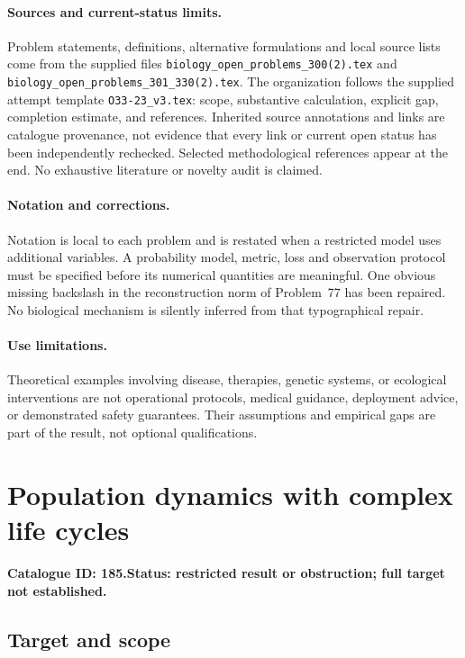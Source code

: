 \documentclass[11pt]{article}
\begin{document}
\paragraph{Sources and current-status limits.}
Problem statements, definitions, alternative formulations and local source lists
come from the supplied files
\texttt{biology\_open\_problems\_300(2).tex} and
\texttt{biology\_open\_problems\_301\_330(2).tex}.
The organization follows the supplied attempt template
\texttt{O33-23\_v3.tex}: scope, substantive calculation, explicit gap,
completion estimate, and references. Inherited source annotations and links are
catalogue provenance, not evidence that every link or current open status has
been independently rechecked. Selected methodological references appear at the
end. No exhaustive literature or novelty audit is claimed.

\paragraph{Notation and corrections.}
Notation is local to each problem and is restated when a restricted model uses
additional variables. A probability model, metric, loss and observation protocol
must be specified before its numerical quantities are meaningful. One obvious
missing backslash in the reconstruction norm of Problem~77 has been repaired.
No biological mechanism is silently inferred from that typographical repair.

\paragraph{Use limitations.}
Theoretical examples involving disease, therapies, genetic systems, or ecological
interventions are not operational protocols, medical guidance, deployment advice,
or demonstrated safety guarantees. Their assumptions and empirical gaps are part
of the result, not optional qualifications.

\setcounter{section}{184}
\section{Population dynamics with complex life cycles}
\label{prob:185}
\noindent\textbf{Catalogue ID: 185.}\quad \textbf{Status: restricted result or obstruction; full target not established.}
\subsection{Target and scope}
\end{document}
